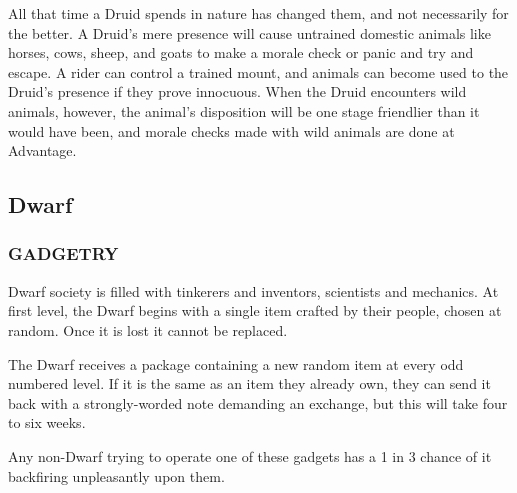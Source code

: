 \documentclass[twoside]{article}
\begin{document}
All that time a Druid spends in nature has changed them, and not necessarily for the better. A Druid's mere presence will cause untrained domestic animals like horses, cows, sheep, and goats to make a morale check or panic and try and escape. A rider can control a trained mount, and animals can become used to the Druid's presence if they prove innocuous. When the Druid encounters wild animals, however, the animal's disposition will be one stage friendlier than it would have been, and morale checks made with wild animals are done at Advantage.

\subsection*{Dwarf}

\subsubsection*{\footnotesize{G}\scriptsize{ADGETRY}\normalsize}

Dwarf society is filled with tinkerers and inventors, scientists and mechanics. At first level, the Dwarf begins with a single item crafted by their people, chosen at random. Once it is lost it cannot be replaced.

\bigbreak

The Dwarf receives a package containing a new random item at every odd numbered level. If it is the same as an item they already own, they can send it back with a strongly-worded note demanding an exchange, but this will take four to six weeks.

\bigbreak

Any non-Dwarf trying to operate one of these gadgets has a 1 in 3 chance of it backfiring unpleasantly upon them.

\bigbreak
\end{document}
